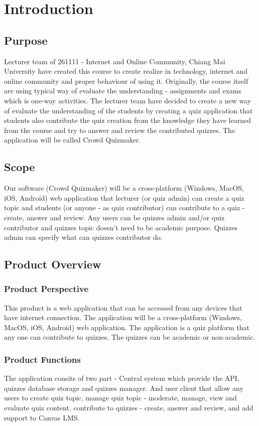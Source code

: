 \documentclass[ 10pt]{report}
\begin{document}
    \chapter{Introduction}
        \section{Purpose}
        Lecturer team of 261111 - Internet and Online Community, Chiang Mai University have created this course to create realize in technology, internet and online community and proper behaviour of using it. Originally, the course itself are using typical way of evaluate the understanding - assignments and exams which is one-way activities. The lecturer team have decided to create a new way of evaluate the understanding of the students by creating a quiz application that students also contribute the quiz creation from the knowledge they have learned from the course and try to answer and review the contributed quizzes. The application will be called Crowd Quizmaker.
        \section{Scope}
        Our software (Crowd Quizmaker) will be a cross-platform (Windows, MacOS, iOS, Android) web application that lecturer (or quiz admin) can create a quiz topic and students (or anyone - as quiz contributor) can contribute to a quiz - create, answer and review. Any users can be quizzes admin and/or quiz contributor and quizzes topic doesn't need to be academic purpose. Quizzes admin can specify what can quizzes contributor do.
        \section{Product Overview}
            \subsection{Product Perspective}
            This product is a web application that can be accessed from any devices that have internet connection. The application will be a cross-platform (Windows, MacOS, iOS, Android) web application. The application is a quiz platform that any one can contribute to quizzes. The quizzes can be academic or non-academic.
            \subsection{Product Functions}
            The application consits of two part - Central system which provide the API, quizzes database storage and quizzes manager. And user client that allow any users to create quiz topic, manage quiz topic - moderate, manage, view and evaluate quiz content, contribute to quizzes - create, answer and review, and add support to Canvas LMS.
\end{document}
